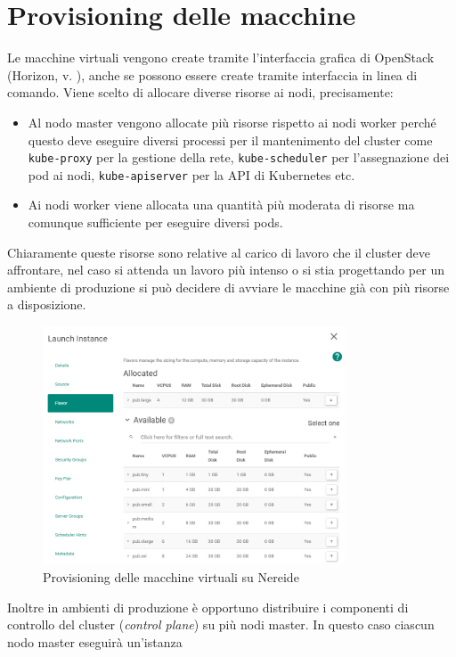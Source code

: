 \documentclass[12pt,a4paper,openright,twoside]{book}
\begin{document}
\section{Provisioning delle macchine}
Le macchine virtuali vengono create tramite l'interfaccia grafica di OpenStack (Horizon, v. ), anche se possono essere create tramite interfaccia in linea di comando. Viene scelto di allocare diverse risorse ai nodi, precisamente: 
\begin{itemize}
    \item Al nodo master vengono allocate più risorse rispetto ai nodi worker perché questo deve eseguire diversi processi per il mantenimento del cluster
        come \texttt{kube-proxy} per la gestione della rete, \texttt{kube-scheduler} per l'assegnazione dei pod ai nodi, \texttt{kube-apiserver} per la API di Kubernetes etc.
    \item Ai nodi worker viene allocata una quantità più moderata di risorse ma comunque sufficiente per eseguire diversi pods. 
\end{itemize}
Chiaramente queste risorse sono relative al carico di lavoro che il cluster deve affrontare, nel caso si attenda un lavoro più intenso o si stia progettando per un ambiente di produzione
si può decidere di avviare le macchine già con più risorse a disposizione.
\begin{figure}[!hbt]
    \centering
    \includegraphics[width=0.8\textwidth]{figures/vm-nereide.png}
    \caption{Provisioning delle macchine virtuali su Nereide}
    \label{fig:kube-vm-provisioning}
\end{figure}
\FloatBarrier
Inoltre in ambienti di produzione è opportuno distribuire i componenti di controllo del cluster (\textit{control plane}) su più nodi master. In questo caso ciascun nodo master eseguirà un'istanza
\end{document}

